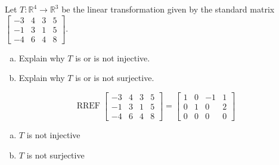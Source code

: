 
\begin{exerciseStatement}
 Let \(T:\mathbb{R}^ 4  \to \mathbb{R}^ 3 \) be the linear transformation given by the standard matrix \( \left[\begin{array}{cccc}
-3 & 4 & 3 & 5 \\
-1 & 3 & 1 & 5 \\
-4 & 6 & 4 & 8
\end{array}\right] .\)
\begin{enumerate}[(a)]
\item Explain why \(T\) is or is not injective.
\item Explain why \(T\) is or is not surjective.
\end{enumerate}
    
\end{exerciseStatement}
    
\begin{exerciseAnswer} 


\[\operatorname{RREF} \left[\begin{array}{cccc}
-3 & 4 & 3 & 5 \\
-1 & 3 & 1 & 5 \\
-4 & 6 & 4 & 8
\end{array}\right] = \left[\begin{array}{cccc}
1 & 0 & -1 & 1 \\
0 & 1 & 0 & 2 \\
0 & 0 & 0 & 0
\end{array}\right] \]


\begin{enumerate}[(a)]
\item \(T\) is not injective
\item \(T\) is not surjective
\end{enumerate}
    
\end{exerciseAnswer}
    
